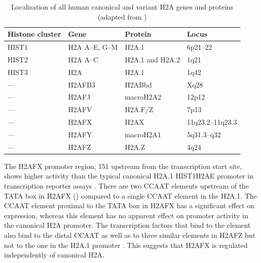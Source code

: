 \begin{table}
\centering
\caption[Localisation of all human canonical and variant H2A genes and
         proteins]%
        {Localisation of all human canonical and variant H2A genes and
          proteins (adapted from \protect\citet{WFM+02})}
\label{tab:h2ax-review:H2A-localisation}
\begin{tabular}{l l l l}
\toprule
Histone cluster & Gene & Protein & Locus  \\
\midrule
HIST1 & H2A A--E, G--M  & H2A.1           & 6p21--22\\
HIST2 & H2A A--C        & H2A.1 and H2A.2 & 1q21\\
HIST3 & H2A             & H2A.1           & 1q42\\
---   & H2AFB3          & H2ABbd          & Xq28\\
---   & H2AFJ           & macroH2A2       & 12p12\\
---   & H2AFV           & H2A.F/Z         & 7p13\\
---   & H2AFX           & H2AX            & 11q23.2--11q23.3\\
---   & H2AFY           & macroH2A1       & 5q31.3--q32\\
---   & H2AFZ           & H2A.Z           & 4q24\\
\bottomrule
\end{tabular}
\end{table}

The H2AFX promoter region, \SI{151}{\bp} upstream from the
transcription start site, shows higher activity than the typical
canonical H2A.1 HIST1H2AE promoter in transcription reporter assays
\citep{VSI94}.  There are two CCAAT elements upstream of the TATA box
in H2AFX () compared to a single CCAAT
element in the H2A.1. The CCAAT element proximal to the TATA box in
H2AFX has a significant effect on expression, whereas this element has
no apparent effect on promoter activity in the canonical H2A
promoter. The transcription factors that bind to the element also bind
to the distal CCAAT as well as to three similar elements in H2AFZ but
not to the one in the H2A.1 promoter \citep{VSI94}.
This suggests that H2AFX is regulated independently of canonical H2A.


